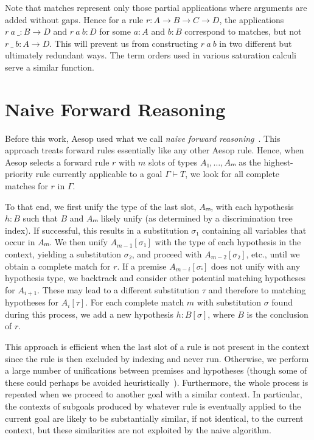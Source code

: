\documentclass[runningheads,leqno]{llncs}
\begin{document}
Note that matches represent only those partial applications where arguments are added without gaps.
Hence for a rule $r : A → B → C → D$, the applications $r~a~\_ : B \to D$ and $r~a~b : D$ for some $a : A$ and $b : B$ correspond to matches, but not $r~\_~b : A \to D$.
This will prevent us from constructing $r~a~b$ in two different but ultimately redundant ways.
The term orders used in various saturation calculi serve a similar function.

\section{Naive Forward Reasoning}%
\label{sec:naive}

Before this work, Aesop used what we call \emph{naive forward reasoning}~\cite{Aesop}.
This approach treats forward rules essentially like any other Aesop rule.
Hence, when Aesop selects a forward rule $r$ with $m$ slots of types $A₁, \dots, Aₘ$ as the highest-priority rule currently applicable to a goal $Γ ⊢ T$, we look for all complete matches for $r$ in $Γ$.

To that end, we first unify the type of the last slot, $Aₘ$, with each hypothesis $h : B$ such that $B$ and $Aₘ$ likely unify (as determined by a discrimination tree index).
If successful, this results in a substitution $σ₁$ containing all variables that occur in $Aₘ$.
We then unify $A_{m-1}[σ₁]$ with the type of each hypothesis in the context, yielding a substitution $σ₂$, and proceed with $A_{m-2}[σ₂]$, etc., until we obtain a complete match for $r$.
If a premise $A_{m-i}[σᵢ]$ does not unify with any hypothesis type, we backtrack and consider other potential matching hypotheses for $A_{i+1}$.
These may lead to a different substitution $τ$ and therefore to matching hypotheses for $A_{i}[τ]$.
For each complete match $m$ with substitution $σ$ found during this process, we add a new hypothesis $h : B[σ]$, where $B$ is the conclusion of $r$.

This approach is efficient when the last slot of a rule is not present in the context since the rule is then excluded by indexing and never run.
Otherwise, we perform a large number of unifications between premises and hypotheses (though some of these could perhaps be avoided heuristically~\cite{TammetSubsumption}).
Furthermore, the whole process is repeated when we proceed to another goal with a similar context.
In particular, the contexts of subgoals produced by whatever rule is eventually applied to the current goal are likely to be substantially similar, if not identical, to the current context, but these similarities are not exploited by the naive algorithm.
\end{document}
